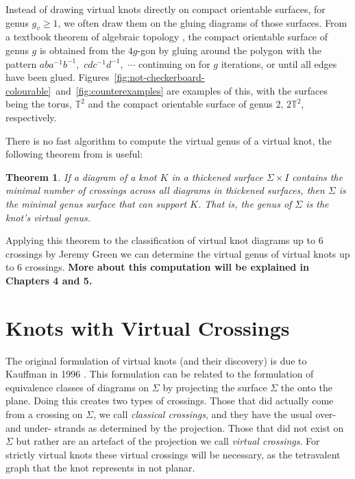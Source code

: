 \documentclass[12pt]{report}
\newcommand{\T}{\mathbb{T}}
\newcommand{\noteblue}[1]{{\color{Blue} \textbf{#1}}}
\newtheorem*{theorem}{Theorem}
\begin{document}
Instead of drawing virtual knots directly on compact orientable surfaces, for genus $g_{v} \geq 1$, we often draw them on the gluing diagrams of those surfaces. From a textbook theorem of algebraic topology \parencite{algebraic-topology}, the compact orientable surface of genus $g$ is obtained from the $4g$-gon by gluing around the polygon with the pattern $aba^{-1}b^{-1}$,~$cdc^{-1}d^{-1}$,~$\cdots$ continuing on for $g$ iterations, or until all edges have been glued. Figures~\ref{fig:not-checkerboard-colourable}~and~\ref{fig:counterexamples} are examples of this, with the surfaces being the torus, $\T^{2}$ and the compact orientable surface of genus 2, $2\T^{2}$, respectively.

There is no fast algorithm to compute the virtual genus of a virtual knot, the following theorem from \cite{parity-and-projection} is useful:
\begin{theorem}
	If a diagram of a knot $K$ in a thickened surface $\Sigma \times I$ contains the minimal number of crossings across all diagrams in thickened surfaces, then $\Sigma$ is the minimal genus surface that can support $K$. That is, the genus of $\Sigma$ is the knot's virtual genus.
\end{theorem}
Applying this theorem to the classification of virtual knot diagrams up to $6$ crossings by Jeremy Green \cite{virtual-knot-table} we can determine the virtual genus of virtual knots up to $6$ crossings. \noteblue{More about this computation will be explained in Chapters 4 and 5.}

\section{Knots with Virtual Crossings}

The original formulation of virtual knots (and their discovery) is due to Kauffman in 1996 \cite{virtual-knot-theory}. This formulation can be related to the formulation of equivalence classes of diagrams on $\Sigma$ by projecting the surface $\Sigma$ the onto the plane. Doing this creates two types of crossings. Those that did actually come from a crossing on $\Sigma$, we call \textit{classical crossings}, and they have the usual over- and under- strands as determined by the projection. Those that did not exist on $\Sigma$ but rather are an artefact of the projection we call \textit{virtual crossings}. For strictly virtual knots these virtual crossings will be necessary, as the tetravalent graph that the knot represents in not planar.
\end{document}
